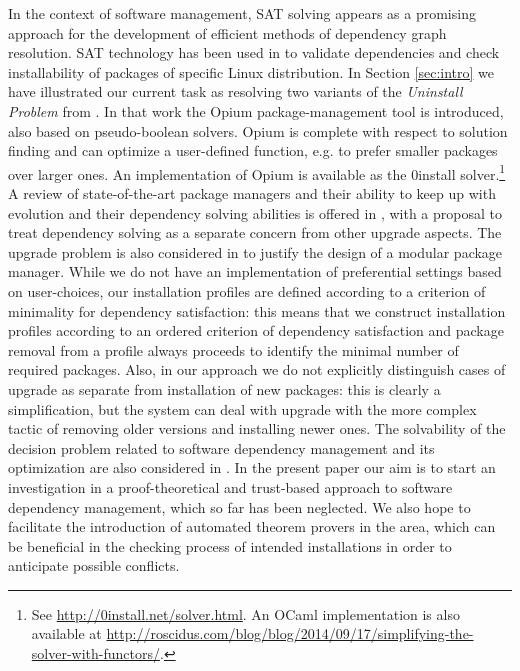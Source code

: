 \documentclass[]{llncs}
\begin{document}
In the context of software management, SAT solving appears as a promising approach for the development of efficient methods of dependency graph resolution. SAT technology has been used in \cite{DBLP:conf/kbse/MancinelliBCVDLT06} to validate dependencies and check installability of packages of specific Linux distribution. In Section \ref{sec:intro} we have illustrated our current task as resolving two variants of the \textit{Uninstall Problem} from \cite{4222580}. In that work the Opium package-management tool is introduced, also based on pseudo-boolean solvers. Opium is complete with respect to solution finding and can optimize a user-defined function, e.g. to prefer smaller packages over larger ones. An implementation of Opium is available as the 0install solver.\footnote{See \url{http://0install.net/solver.html}. An OCaml implementation is also available at \url{http://roscidus.com/blog/blog/2014/09/17/simplifying-the-solver-with-functors/}.}  A review of state-of-the-art package managers and their ability to keep up with evolution and their dependency solving abilities is offered in \cite{DBLP:journals/jss/AbateCTZ12}, with a proposal to treat dependency solving as a separate concern from other upgrade aspects. The upgrade problem is also considered in \cite{Abate:2011:MMP:2000229.2000255} to justify the design of a modular package manager. While we do not have an implementation of preferential settings based on user-choices, our installation profiles are defined according to a criterion of minimality for dependency satisfaction: this means that we construct installation profiles according to an ordered criterion of dependency satisfaction and package removal from a profile always proceeds to identify the minimal number of required packages. Also, in our approach we do not explicitly distinguish cases of upgrade as separate from installation of new packages: this is clearly a simplification, but the system can deal with upgrade with the more complex tactic of removing older versions and installing newer ones. The solvability of the decision problem related to software dependency management and its optimization are also considered in \cite{DBLP:conf/splc/BerreP08}. In the present paper our aim is to start an investigation in a proof-theoretical and trust-based approach to software dependency management, which so far has been neglected. We also hope to facilitate the introduction of automated theorem provers in the area, which can be beneficial in the checking process of intended installations in order to anticipate possible conflicts.
\end{document}
